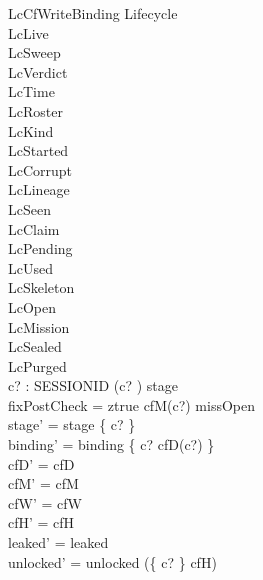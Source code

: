 \documentclass[a4paper,10pt,fleqn]{article}
\begin{document}
\begin{schema}{LcCfWriteBinding}
\Delta Lifecycle \\
\Xi LcLive \\
\Xi LcSweep \\
\Xi LcVerdict \\
\Xi LcTime \\
\Xi LcRoster \\
\Xi LcKind \\
\Xi LcStarted \\
\Xi LcCorrupt \\
\Xi LcLineage \\
\Xi LcSeen \\
\Xi LcClaim \\
\Xi LcPending \\
\Xi LcUsed \\
\Xi LcSkeleton \\
\Xi LcOpen \\
\Xi LcMission \\
\Xi LcSealed \\
\Xi LcPurged \\
c? : SESSIONID
\where
(c? ) \in stage \\
fixPostCheck = ztrue \implies cfM(c?) \in missOpen \\
stage' = stage \oplus \{ c?  \} \\
binding' = binding \oplus \{ c? \mapsto cfD(c?) \} \\
cfD' = cfD \\
cfM' = cfM \\
cfW' = cfW \\
cfH' = cfH \\
leaked' = leaked \\
unlocked' = unlocked \cup (\{ c? \} \setminus cfH)
\end{schema}
\end{document}
